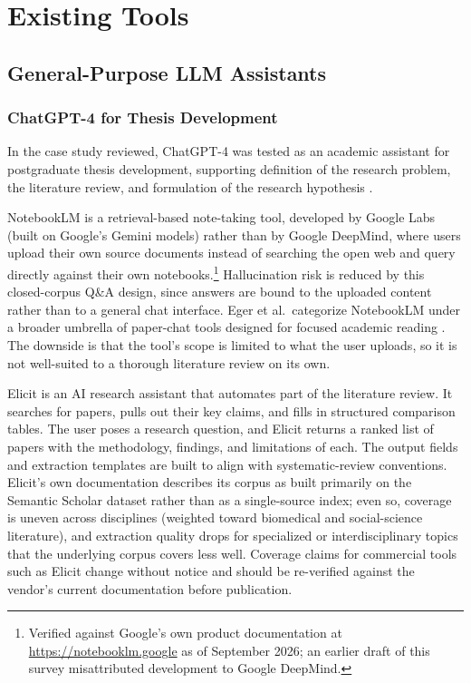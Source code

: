 \documentclass[sn-basic,Numbered]{sn-jnl}
\begin{document}
\section{Existing Tools}
\label{sec:existingtools}

\subsection{General-Purpose LLM Assistants}

\subsubsection{ChatGPT-4 for Thesis Development}

In the case study reviewed, ChatGPT-4 was tested as an academic
assistant for postgraduate thesis development, supporting definition
of the research problem, the literature review, and formulation of
the research hypothesis \cite{suarez2024chatgpt4}.

NotebookLM is a retrieval-based note-taking tool, developed by Google
Labs (built on Google's Gemini models) rather than by Google DeepMind,
where users upload their own source documents instead of
searching the open web and query directly against their own
notebooks.\footnote{Verified against Google's own product
documentation at \url{https://notebooklm.google} as of September 2026;
an earlier draft of this survey misattributed development to Google
DeepMind.} Hallucination risk is reduced by this closed-corpus Q\&A
design, since answers are bound to the uploaded content rather than
to a general chat interface. Eger et al.\ categorize NotebookLM under
a broader umbrella of paper-chat tools designed for focused academic
reading \cite{eger2025transformingscience}. The downside is that the
tool's scope is limited to what the user uploads, so it is not
well-suited to a thorough literature review on its own.

Elicit is an AI research assistant that automates part of the
literature review. It searches for papers, pulls out their key claims,
and fills in structured comparison tables. The user poses a research
question, and Elicit returns a ranked list of papers with the
methodology, findings, and limitations of each. The
output fields and extraction templates are built to align with
systematic-review conventions. Elicit's own documentation describes its
corpus as built primarily on the Semantic Scholar dataset rather than
as a single-source index; even so, coverage is uneven across
disciplines (weighted toward biomedical and social-science literature),
and extraction quality drops for specialized or interdisciplinary
topics that the underlying corpus covers less well. Coverage claims for
commercial tools such as Elicit change without notice and should be
re-verified against the vendor's current documentation before
publication.
\end{document}
